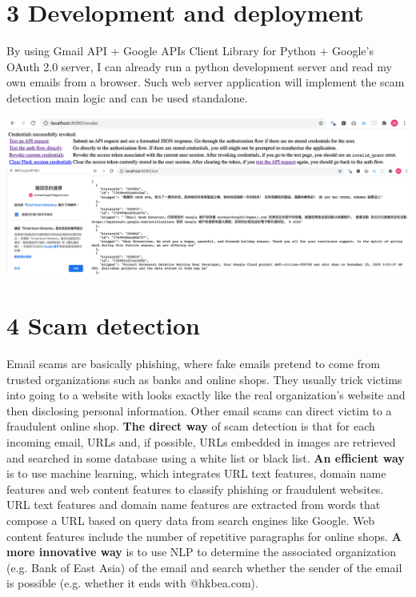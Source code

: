 \documentclass[11pt]{article}
\begin{document}
\vspace{-10pt}
\section*{\large{3 \hspace{10pt} Development and deployment}}
By using Gmail API + Google APIs Client Library for Python + Google's OAuth 2.0 server, I can already run a python development server and read my own emails from a browser. Such web server application will implement the scam detection main logic and can be used standalone.

\begin{center}
	\includegraphics[width=0.7\columnwidth]{dev.png} %
\end{center}


\section*{\large{4 \hspace{10pt} Scam detection}}
Email scams are basically phishing, where fake emails pretend to come from trusted organizations such as banks and online shops. They usually trick victims into going to a website with looks exactly like the real organization's website and then disclosing personal information. Other email scams can direct victim to a fraudulent online shop.
\textbf{The direct way} of scam detection is that for each incoming email, URLs and, if possible, URLs embedded in images are retrieved and searched in some database using a white list or black list.
\textbf{An efficient way} is to use machine learning, which integrates URL text features, domain name features and web content features to classify phishing or fraudulent websites. URL text features and domain name features are extracted from words that compose a URL based on query data from search engines like Google. Web content features include the number of repetitive paragraphs for online shops.
\textbf{A more innovative way} is to use NLP to determine the associated organization (e.g. Bank of East Asia) of the email and search whether the sender of the email is possible (e.g. whether it ends with @hkbea.com).
\end{document}
